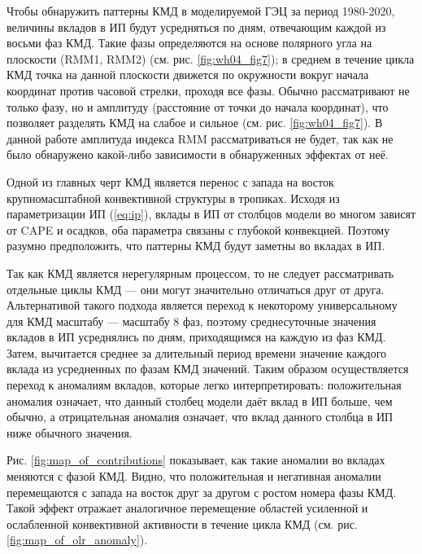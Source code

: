 
Чтобы обнаружить паттерны КМД в моделируемой ГЭЦ за период 1980-2020, величины вкладов в ИП будут усредняться по дням, отвечающим каждой из восьми фаз КМД. Такие фазы определяются на основе полярного угла на плоскости (RMM1, RMM2) (см. рис. \ref{fig:wh04_fig7}); в среднем в течение цикла КМД точка на данной плоскости движется по окружности вокруг начала координат против часовой стрелки, проходя все фазы. Обычно рассматривают не только фазу, но и амплитуду (расстояние от точки до начала координат), что позволяет разделять КМД на слабое и сильное (см. рис. \ref{fig:wh04_fig7}). В данной работе амплитуда индекса RMM рассматриваться не будет, так как не было обнаружено какой-либо зависимости в обнаруженных эффектах от неё.

Одной из главных черт КМД является перенос с запада на восток крупномасштабной конвективной структуры в тропиках. Исходя из параметризации ИП (\ref{eq:ip}), вклады в ИП от столбцов модели во многом зависят от CAPE и осадков, оба параметра связаны с глубокой конвекцией. Поэтому разумно предположить, что паттерны КМД будут заметны во вкладах в ИП.

Так как КМД является нерегулярным процессом, то не следует рассматривать отдельные циклы КМД --- они могут значительно отличаться друг от друга. Альтернативой такого подхода является переход к некоторому универсальному для КМД масштабу --- масштабу 8 фаз, поэтому среднесуточные значения вкладов в ИП усреднялись по дням, приходящимся на каждую из фаз КМД. Затем, вычитается среднее за длительный период времени значение каждого вклада из усредненных по фазам КМД значений. Таким образом осуществляется переход к аномалиям вкладов, которые легко интерпретировать: положительная аномалия означает, что данный столбец модели даёт вклад в ИП больше, чем обычно, а отрицательная аномалия означает, что вклад данного столбца в ИП ниже обычного значения.

Рис. \ref{fig:map_of_contributions} показывает, как такие аномалии во вкладах меняются с фазой КМД. Видно, что положительная и негативная аномалии перемещаются с запада на восток друг за другом с ростом номера фазы КМД. Такой эффект отражает аналогичное перемещение областей усиленной и ослабленной конвективной активности в течение цикла КМД (см. рис. \ref{fig:map_of_olr_anomaly}).

